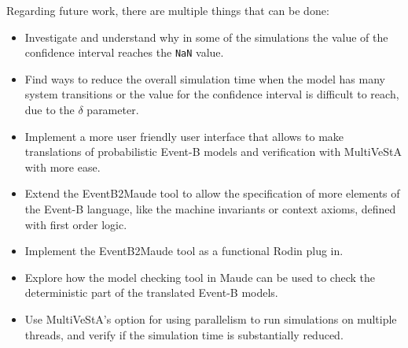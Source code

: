 Regarding future work, there are multiple things that can be done:
\begin{itemize}
    \item Investigate and understand why in some of the simulations the value of the confidence interval reaches the \texttt{NaN} value.
    \item Find ways to reduce the overall simulation time when the model has many system transitions or the value for the confidence interval is difficult to reach, due to the $\delta$ parameter.
    \item Implement a more user friendly user interface that allows to make translations of probabilistic Event-B models and verification with MultiVeStA with more ease.
    \item Extend the EventB2Maude tool to allow the specification of more elements of the Event-B language, like the machine invariants or context axioms, defined with first order logic. 
    \item Implement the EventB2Maude tool as a functional Rodin plug in.
    \item Explore how the model checking tool in Maude can be used to check the deterministic part of the translated Event-B models.
    \item Use MultiVeStA's option for using parallelism to run simulations on multiple threads, and verify if the simulation time is substantially reduced.
\end{itemize}